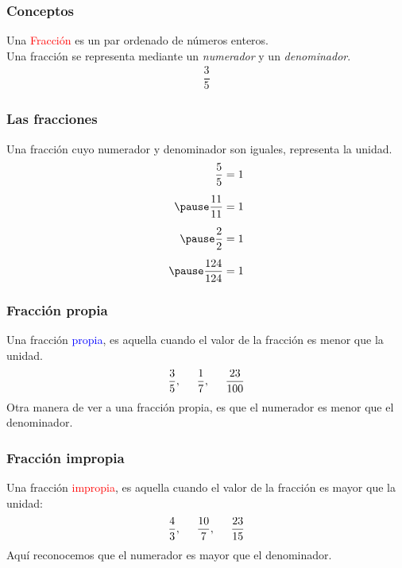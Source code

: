 \begin{frame}
\frametitle{Conceptos}
Una \textcolor{red}{Fracción} es un par ordenado de números enteros.
\\
\bigskip
\pause
Una fracción se representa mediante un \emph{numerador} y un \emph{denominador}.
\begin{align*}
\dfrac{3}{5}
\end{align*}
\begin{figure}[H]
\end{figure}
\end{frame}
\begin{frame}
\frametitle{Las fracciones}
Una fracción cuyo numerador y denominador son iguales, representa la unidad.
\begin{eqnarray*}
\dfrac{5}{5} = 1 \\[0.5em] \pause
\dfrac{11}{11} = 1 \\[0.5em] \pause
\dfrac{2}{2} = 1 \\[0.5em] \pause
\dfrac{124}{124} = 1
\end{eqnarray*}
\end{frame}
\begin{frame}
\frametitle{Fracción propia}
Una fracción \textcolor{blue}{propia}, es aquella cuando el valor de la fracción es menor que la unidad.
\begin{align*}
\dfrac{3}{5}, \hspace{0.5cm} \dfrac{1}{7}, \hspace{0.5cm} \dfrac{23}{100}
\end{align*}
\pause
Otra manera de ver a una fracción propia, es que el numerador es menor que el denominador.
\end{frame}
\begin{frame}
\frametitle{Fracción impropia}
Una fracción \textcolor{red}{impropia}, es aquella cuando el valor de la fracción es mayor que la unidad:
\begin{align*}
\dfrac{4}{3}, \hspace{0.5cm} \dfrac{10}{7}, \hspace{0.5cm} \dfrac{23}{15}
\end{align*}
\pause
Aquí reconocemos que el numerador es mayor que el denominador.
\end{frame}
